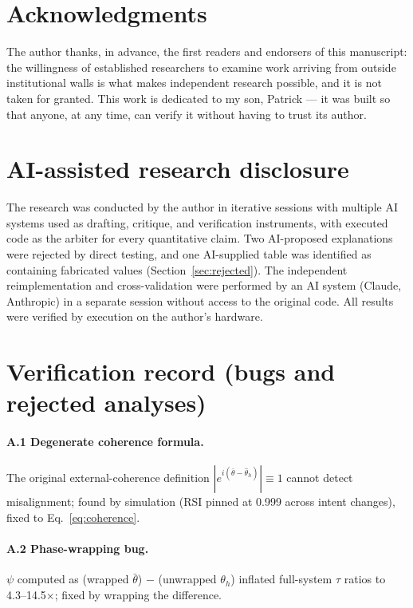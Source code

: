\documentclass[11pt]{article}
\begin{document}
\section*{Acknowledgments}

The author thanks, in advance, the first readers and endorsers of this
manuscript: the willingness of established researchers to examine work
arriving from outside institutional walls is what makes independent research
possible, and it is not taken for granted. This work is dedicated to my son,
Patrick --- it was built so that anyone, at any time, can verify it without
having to trust its author.

\section*{AI-assisted research disclosure}

The research was conducted by the author in iterative sessions with multiple
AI systems used as drafting, critique, and verification instruments, with
executed code as the arbiter for every quantitative claim. Two AI-proposed
explanations were rejected by direct testing, and one AI-supplied table was
identified as containing fabricated values (Section~\ref{sec:rejected}). The
independent reimplementation and cross-validation were performed by an AI
system (Claude, Anthropic) in a separate session without access to the
original code. All results were verified by execution on the author's
hardware.

\appendix
\section{Verification record (bugs and rejected analyses)}\label{app:record}

\paragraph{A.1 Degenerate coherence formula.} The original external-coherence
definition $|e^{i(\bar\theta-\hat\theta_h)}| \equiv 1$ cannot detect
misalignment; found by simulation (RSI pinned at 0.999 across intent changes),
fixed to Eq.~\eqref{eq:coherence}.

\paragraph{A.2 Phase-wrapping bug.} $\psi$ computed as (wrapped $\bar\theta$)
$-$ (unwrapped $\theta_h$) inflated full-system $\tau$ ratios to
4.3--14.5$\times$; fixed by wrapping the difference.
\end{document}
